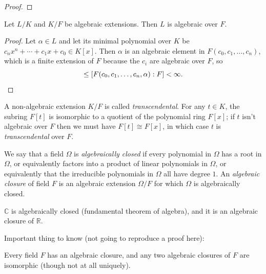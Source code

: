 \documentclass[10pt]{article}
\providecommand{\CC}{\mathbb C}
\providecommand{\RR}{\mathbb R}
\providecommand{\vocab}[1]{{{\sffamily\textit{#1}}}}
\begin{document}
\begin{proof}
\end{proof}

\begin{prop}
    \label{prop:double-algebraic-extension}
    Let $L/K$ and $K/F$ be algebraic extensions.
    Then $L$ is algebraic over $F$.
\end{prop}

\begin{proof}
    Let $\alpha\in L$ and let its minimal polynomial over $K$ be
    $c_nx^n + \cdots + c_1x + c_0\in K[x]$.
    Then $\alpha$ is an algebraic element in
    $F(c_0,c_1,\dots,c_n)$, which is a finite extension of $F$
    because the $c_i$ are algebraic over $F$, so
    \begin{equation*}
	[F(\alpha) : F] \le [F(c_0,c_1,\dots,c_n,\alpha) : F] < \infty.
	\qedhere
    \end{equation*}
\end{proof}

\begin{remark}
    A non-algebraic extension $K/F$ is called \vocab{transcendental}.
    For any $t\in K$, the subring $F[t]$ is isomorphic to
    a quotient of the polynomial ring $F[x]$;
    if $t$ isn't algebraic over $F$ then we must have $F[t]\cong F[x]$,
    in which case $t$ is \vocab{transcendental} over $F$.
\end{remark}

We say that a field $\Omega$ is \vocab{algebraically closed}
if every polynomial in $\Omega$ has a root in $\Omega$,
or equivalently factors into a product of linear polynomials in $\Omega$,
or equivalently that the irreducible polynomials
in $\Omega$ all have degree $1$.
An \vocab{algebraic closure} of field $F$
is an algebraic extension $\Omega/F$ for which $\Omega$ is algebraically closed.

\begin{example}
    \label{ex:algebraic-closure-of-R}
    $\CC$ is algebraically closed (fundamental theorem of algebra),
    and it is an algebraic closure of $\RR$.
\end{example}

Important thing to know (not going to reproduce a proof here):
\begin{theorem}
    \label{thm:algebraic-closures-exist}
    Every field $F$ has an algebraic closure,
    and any two algebraic closures of $F$ are isomorphic
    (though not at all uniquely).
\end{theorem}
\end{document}

